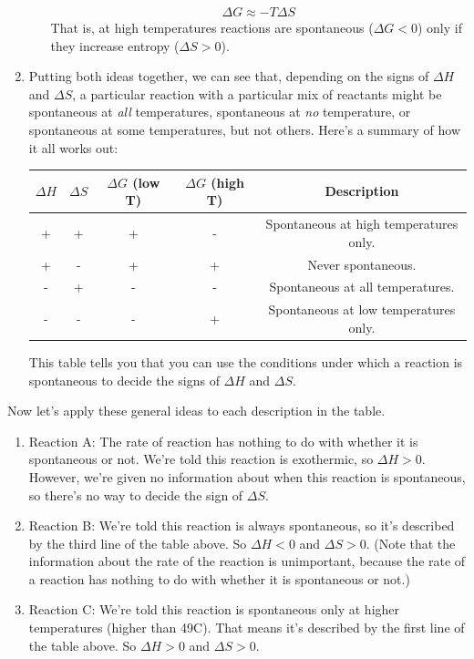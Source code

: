 \documentclass{article}  %
\begin{document}
\begin{enumerate}
\begin{enumerate}
\begin{equation*}
\begin{aligned}
                        \Delta G \approx -T \Delta S
                    \end{aligned}
                \end{equation*}
                That is, at high temperatures reactions are spontaneous ($\Delta G < 0$) only if they increase entropy ($\Delta S > 0$).
        \end{enumerate}
    \item Putting both ideas together, we can see that, depending on the signs of $\Delta H$ and $\Delta S$, a particular reaction with a particular mix of reactants might be spontaneous at \emph{all} temperatures, spontaneous at \emph{no} temperature, or spontaneous at some temperatures, but not others. Here's a summary of how it all works out:
        \begin{center}
            \begin{tabular}{| c | c | c | c | c |}
                $\Delta H$ & $\Delta S$ & $\Delta G$ (low T) & $\Delta G$ (high T) & Description \\
                \hline
                + & + & + & - & Spontaneous at high temperatures only. \\
                + & - & + & + & Never spontaneous. \\
                - & + & - & - & Spontaneous at all temperatures. \\
                - & - & - & + & Spontaneous at low temperatures only.
            \end{tabular}
        \end{center}
    This table tells you that you can use the conditions under which a reaction is spontaneous to decide the signs of $\Delta H$ and $\Delta S$. \\
\end{enumerate}
Now let's apply these general ideas to each description in the table.
\begin{enumerate}
    \item Reaction A: The rate of reaction has nothing to do with whether it is spontaneous or not. We're told this reaction is exothermic, so $\Delta H > 0$. However, we're given no information about when this reaction is spontaneous, so there's no way to decide the sign of $\Delta S$. 
    \item Reaction B: We're told this reaction is always spontaneous, so it's described by the third line of the table above. So $\Delta H < 0$ and $\Delta S > 0$. (Note that the information about the rate of the reaction is unimportant, because the rate of a reaction has nothing to do with whether it is spontaneous or not.) 
    \item Reaction C: We're told this reaction is spontaneous only at higher temperatures (higher than 49C). That means it's described by the first line of the table above. So $\Delta H > 0$ and $\Delta S > 0$. 
\end{enumerate}
\end{document}
